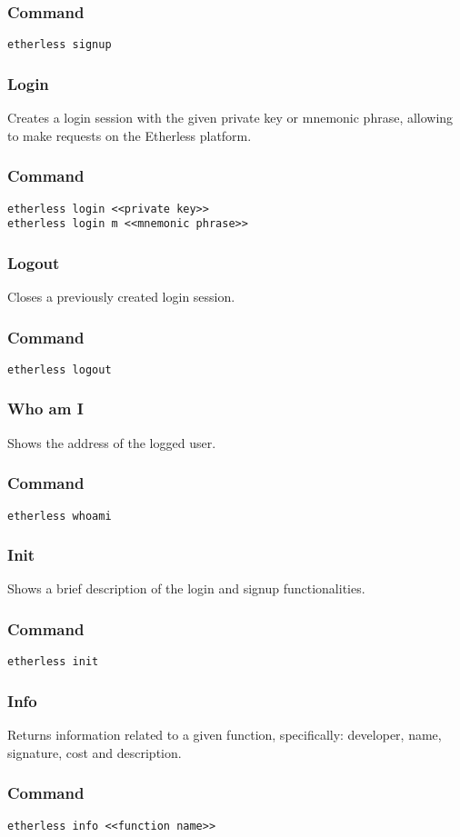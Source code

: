 \subsubsection*{Command}
\texttt{etherless signup}
\subsubsection{Login}
Creates a login session with the given private key or mnemonic phrase, allowing to make requests on the Etherless platform.
\subsubsection*{Command}
\texttt{etherless login <<private key>>} \\
\texttt{etherless login m <<mnemonic phrase>>}
\subsubsection{Logout}
Closes a previously created login session.
\subsubsection*{Command}
\texttt{etherless logout}
\subsubsection{Who am I}
Shows the address of the logged user.
\subsubsection*{Command}
\texttt{etherless whoami}
\subsubsection{Init}
Shows a brief description of the login and signup functionalities.
\subsubsection*{Command}
\texttt{etherless init}
\subsubsection{Info}
Returns information related to a given function, specifically: developer, name, signature, cost and description. 
\subsubsection*{Command}
\texttt{etherless info <<function name>>}
